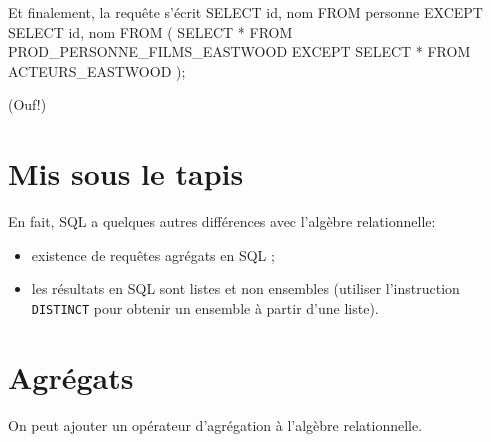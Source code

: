 Et finalement, la requête s'écrit
SELECT id, nom FROM personne
EXCEPT
SELECT id, nom FROM (
    SELECT * FROM PROD\_PERSONNE\_FILMS\_EASTWOOD
    EXCEPT
    SELECT * FROM ACTEURS\_EASTWOOD
);

(Ouf!)
\section{Mis sous le tapis}
En fait, SQL a quelques autres différences avec l'algèbre
relationnelle:

\begin{itemize}
\item existence de requêtes agrégats en SQL ;
\item les résultats en SQL sont listes et non ensembles (utiliser l'instruction \texttt{DISTINCT} pour obtenir un ensemble à partir d'une liste).
\end{itemize}

\section{Agrégats}

On peut ajouter un opérateur d'agrégation à l'algèbre relationnelle.


